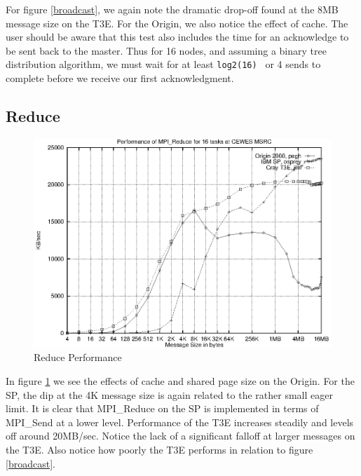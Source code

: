 \documentclass [12pt]{article}
\begin{document}
For figure \ref{broadcast}, we again note the dramatic drop-off found at the 8MB message
size on the T3E. For the Origin, we also notice the effect of cache. The user
should be aware that this test also includes the time for an acknowledge to
be sent back to the master. Thus for 16 nodes, and assuming a binary tree
distribution algorithm, we must wait for at least {\tt log2(16) } or 4
sends to complete before we receive our first acknowledgment. 

\clearpage
\newpage

\subsection{Reduce}
\begin{figure}[Hht]
\centerline{\includegraphics{pics/cewes_mpi_reduce.ps}}
\caption{Reduce Performance}\label{reduce}
\end{figure}

In figure \ref{reduce} we see the effects of cache and shared page size on the Origin. 
For the SP, the dip at the 4K message size is again related to the rather
small eager limit. It is clear that MPI\_Reduce on the SP is implemented
in terms of MPI\_Send at a lower level. Performance of the T3E increases
steadily and levels off around 20MB/sec. Notice the lack of a significant
falloff at larger messages on the T3E. Also notice how poorly the T3E performs
in relation to figure \ref{broadcast}.

\clearpage
\newpage
\end{document}
